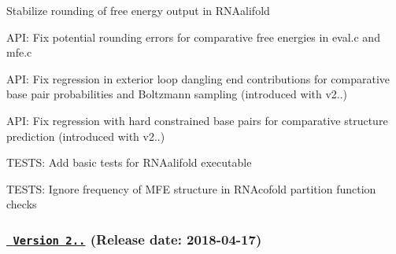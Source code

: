 \begin{DoxyItemize}
\item Stabilize rounding of free energy output in R\+N\+Aalifold
\item A\+PI\+: Fix potential rounding errors for comparative free energies in eval.\+c and mfe.\+c
\item A\+PI\+: Fix regression in exterior loop dangling end contributions for comparative base pair probabilities and Boltzmann sampling (introduced with v2..)
\item A\+PI\+: Fix regression with hard constrained base pairs for comparative structure prediction (introduced with v2..)
\item T\+E\+S\+TS\+: Add basic tests for R\+N\+Aalifold executable
\item T\+E\+S\+TS\+: Ignore \textquotesingle{}frequency of M\+FE structure\textquotesingle{} in R\+N\+Acofold partition function checks
\end{DoxyItemize}

\subsubsection*{\href{https://github.com/ViennaRNA/ViennaRNA/compare/v2.4.4...v2.4.5}{\texttt{ Version 2..}} (Release date\+: 2018-\/04-\/17)}


